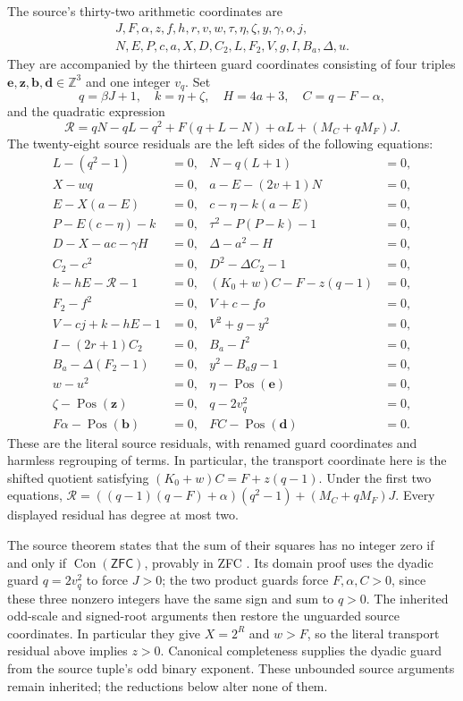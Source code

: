 \documentclass[11pt,a4paper]{article}
\theoremstyle{definition}
\theoremstyle{remark}
\newcommand{\Z}{\mathbb Z}
\newcommand{\Con}{\operatorname{Con}}
\newcommand{\ZFC}{\mathsf{ZFC}}
\newcommand{\pos}{\operatorname{Pos}}
\begin{document}
The source's thirty-two arithmetic coordinates are
\[
 \begin{gathered}
 J,F,\alpha,z,f,h,r,v,w,\tau,\eta,\zeta,y,\gamma,o,j,\\
 N,E,P,c,a,X,D,C_2,L,F_2,V,g,I,B_a,\Delta,u.
 \end{gathered}
\]
They are accompanied by the thirteen guard coordinates consisting of
four triples
\(\boldsymbol e,\boldsymbol z,\boldsymbol b,\boldsymbol d\in\Z^3\)
and one integer \(v_q\). Set
\[
 q=\beta J+1,\quad k=\eta+\zeta,\quad H=4a+3,\quad C=q-F-\alpha,
\]
and the quadratic expression
\[
 \mathcal R=qN-qL-q^2+F(q+L-N)+\alpha L+(M_C+qM_F)J.
\]
The twenty-eight source residuals are the left sides of the following
equations:
\begin{align}
 L-(q^2-1)&=0,& N-q(L+1)&=0, \nonumber\\
 X-wq&=0,& a-E-(2v+1)N&=0, \nonumber\\
 E-X(a-E)&=0,& c-\eta-k(a-E)&=0, \nonumber\\
 P-E(c-\eta)-k&=0,& \tau^2-P(P-k)-1&=0, \nonumber\\
 D-X-ac-\gamma H&=0,& \Delta-a^2-H&=0, \nonumber\\
 C_2-c^2&=0,& D^2-\Delta C_2-1&=0, \nonumber\\
 k-hE-\mathcal R-1&=0,& (K_0+w)C-F-z(q-1)&=0, \nonumber\\
 F_2-f^2&=0,& V+c-fo&=0, \nonumber\\
 V-cj+k-hE-1&=0,& V^2+g-y^2&=0, \nonumber\\
 I-(2r+1)C_2&=0,& B_a-I^2&=0, \nonumber\\
 B_a-\Delta(F_2-1)&=0,& y^2-B_ag-1&=0, \nonumber\\
 w-u^2&=0,& \eta-\pos(\boldsymbol e)&=0, \nonumber\\
 \zeta-\pos(\boldsymbol z)&=0,& q-2v_q^2&=0, \nonumber\\
 F\alpha-\pos(\boldsymbol b)&=0,&
 FC-\pos(\boldsymbol d)&=0.                 \label{eq:Q45system}
\end{align}
These are the literal source residuals, with renamed guard coordinates
and harmless regrouping of terms. In particular, the transport
coordinate here is the shifted quotient satisfying
\((K_0+w)C=F+z(q-1)\).
Under the first two equations,
\(\mathcal R=((q-1)(q-F)+\alpha)(q^2-1)+(M_C+qM_F)J\).
Every displayed residual has degree at most two.

The source theorem states that the sum of their squares has no integer
zero if and only if \(\Con(\ZFC)\), provably in ZFC
\cite{quartic45,oddscale}. Its domain proof uses the dyadic guard
\(q=2v_q^2\) to force \(J>0\); the two product guards force
\(F,\alpha,C>0\), since these three nonzero integers have the same sign
and sum to \(q>0\). The inherited odd-scale and signed-root arguments
then restore the unguarded source coordinates. In particular they give
\(X=2^R\) and \(w>F\), so the literal transport residual above implies
\(z>0\). Canonical completeness supplies the dyadic guard from the source
tuple's odd binary exponent. These unbounded source arguments remain
inherited; the reductions below alter none of them.
\end{document}
